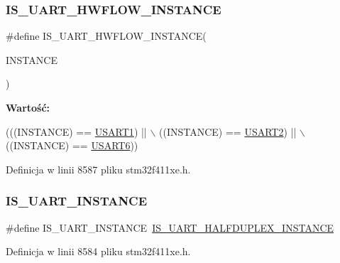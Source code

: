 \subsubsection{\texorpdfstring{I\+S\+\_\+\+U\+A\+R\+T\+\_\+\+H\+W\+F\+L\+O\+W\+\_\+\+I\+N\+S\+T\+A\+N\+CE}{IS\_UART\_HWFLOW\_INSTANCE}}
{\footnotesize\ttfamily \#define I\+S\+\_\+\+U\+A\+R\+T\+\_\+\+H\+W\+F\+L\+O\+W\+\_\+\+I\+N\+S\+T\+A\+N\+CE(\begin{DoxyParamCaption}\item[{}]{I\+N\+S\+T\+A\+N\+CE }\end{DoxyParamCaption})}

{\bfseries Wartość\+:}
\begin{DoxyCode}
(((INSTANCE) == \hyperlink{group___peripheral__declaration_ga92871691058ff7ccffd7635930cb08da}{USART1}) || \(\backslash\)
                                           ((INSTANCE) == \hyperlink{group___peripheral__declaration_gaf114a9eab03ca08a6fb720e511595930}{USART2}) || \(\backslash\)
                                           ((INSTANCE) == \hyperlink{group___peripheral__declaration_ga2dab39a19ce3dd05fe360dcbb7b5dc84}{USART6}))
\end{DoxyCode}


Definicja w linii 8587 pliku stm32f411xe.\+h.

\mbox{\label{group___exported__macros_ga14e4b19f7c750110f6c27cf26347ba45}} 
\subsubsection{\texorpdfstring{I\+S\+\_\+\+U\+A\+R\+T\+\_\+\+I\+N\+S\+T\+A\+N\+CE}{IS\_UART\_INSTANCE}}
{\footnotesize\ttfamily \#define I\+S\+\_\+\+U\+A\+R\+T\+\_\+\+I\+N\+S\+T\+A\+N\+CE~\hyperlink{group___exported__macros_ga69c4aa0c561c4c39c621710fbbb0cb7b}{I\+S\+\_\+\+U\+A\+R\+T\+\_\+\+H\+A\+L\+F\+D\+U\+P\+L\+E\+X\+\_\+\+I\+N\+S\+T\+A\+N\+CE}}



Definicja w linii 8584 pliku stm32f411xe.\+h.

\mbox{\label{group___exported__macros_gaf7905bb5a02acf0e92ddf40bdd8dcdc0}} 
